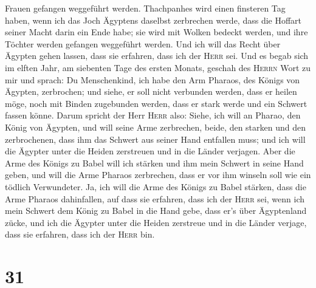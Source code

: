 Frauen gefangen weggeführt werden.  Thachpanhes wird
einen finsteren Tag haben, wenn ich das Joch Ägyptens daselbst
zerbrechen werde, dass die Hoffart seiner Macht darin ein Ende habe; sie
wird mit Wolken bedeckt werden, und ihre Töchter werden gefangen
weggeführt werden.  Und ich will das Recht über Ägypten
gehen lassen, dass sie erfahren, dass ich der \textsc{Herr} sei.
 Und es begab sich im elften Jahr, am siebenten Tage des
ersten Monats, geschah des \textsc{Herrn} Wort zu mir und sprach:
 Du Menschenkind, ich habe den Arm Pharaos, des Königs
von Ägypten, zerbrochen; und siehe, er soll nicht verbunden werden, dass
er heilen möge, noch mit Binden zugebunden werden, dass er stark werde
und ein Schwert fassen könne.  Darum spricht der Herr
\textsc{Herr} also: Siehe, ich will an Pharao, den König von Ägypten,
und will seine Arme zerbrechen, beide, den starken und den zerbrochenen,
dass ihm das Schwert aus seiner Hand entfallen muss;  und
ich will die Ägypter unter die Heiden zerstreuen und in die Länder
verjagen.  Aber die Arme des Königs zu Babel will ich
stärken und ihm mein Schwert in seine Hand geben, und will die Arme
Pharaos zerbrechen, dass er vor ihm winseln soll wie ein tödlich
Verwundeter.  Ja, ich will die Arme des Königs zu Babel
stärken, dass die Arme Pharaos dahinfallen, auf dass sie erfahren, dass
ich der \textsc{Herr} sei, wenn ich mein Schwert dem König zu Babel in
die Hand gebe, dass er's über Ägyptenland zücke,  und ich
die Ägypter unter die Heiden zerstreue und in die Länder verjage, dass
sie erfahren, dass ich der \textsc{Herr} bin.

\hypertarget{section-30}{%
\section{31}\label{section-30}}

